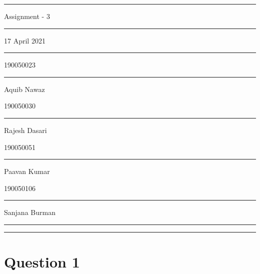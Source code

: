 \documentclass{report}
\begin{document}
 \rule[0mm]{16cm}{0.4pt}
 \begin{center}%
  {\LARGE Assignment - 3\par}%
 \end{center}%
 \par
 \begin{center}
 {\rule[0mm]{8cm}{0.4pt}}
 \end{center}
 \begin{center}%
  {\LARGE 17 April 2021 \par}%
 \end{center}
 \begin{center}
 {\rule[0mm]{8cm}{0.4pt}}
 \end{center}
 \begin{center}
  \large 190050023 \rule[0.5mm]{1cm}{0pt} Aquib Nawaz\par
 \end{center}
 \begin{center}
  \large 190050030 \rule[0.5mm]{0.9cm}{0pt} Rajesh Dasari\par
 \end{center}
 \begin{center}
  \large 190050051 \rule[0.5mm]{0.8cm}{0pt}Paavan Kumar\par
 \end{center}
 \begin{center}
  \large 190050106 \rule[0.5mm]{0.4cm}{0pt} Sanjana Burman\par
  \rule[0mm]{8cm}{0.4pt}
 \end{center}
 \rule[12mm]{16cm}{0.4pt}
 \section*{Question 1}
\end{document}
